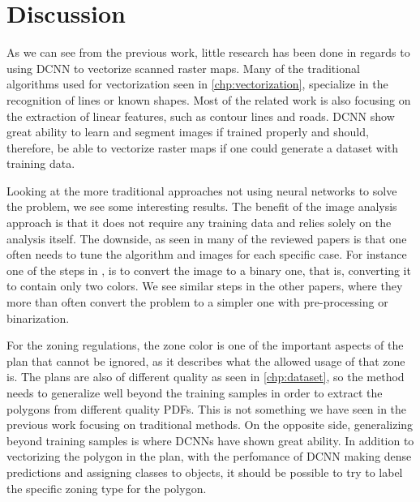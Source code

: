 \chapter{Discussion}
As we can see from the previous work, little research has been done in regards to using DCNN to vectorize scanned raster maps. Many of the traditional algorithms used for vectorization seen in \autoref{chp:vectorization}, specialize in the recognition of lines or known shapes. Most of the related work is also focusing on the extraction of linear features, such as contour lines and roads. DCNN show great ability to learn and segment images if trained properly and should, therefore, be able to vectorize raster maps if one could generate a dataset with training data.

Looking at the more traditional approaches not using neural networks to solve the problem, we see some interesting results. The benefit of the image analysis approach is that it does not require any training data and relies solely on the analysis itself. The downside, as seen in many of the reviewed papers is that one often needs to tune the algorithm and images for each specific case. For instance one of the steps in \citet{Iosifescu2016}, is to convert the image to a binary one, that is, converting it to contain only two colors. We see similar steps in the other papers, where they more than often convert the problem to a simpler one with pre-processing or binarization.

For the zoning regulations, the zone color is one of the important aspects of the plan that cannot be ignored, as it describes what the allowed usage of that zone is. The plans are also of different quality as seen in \autoref{chp:dataset}, so the method needs to generalize well beyond the training samples in order to extract the polygons from different quality PDFs. This is not something we have seen in the previous work focusing on traditional methods. On the opposite side, generalizing beyond training samples is where DCNNs have shown great ability. In addition to vectorizing the polygon in the plan, with the perfomance of DCNN making dense predictions and assigning classes to objects, it should be possible to try to label the specific zoning type for the polygon.


